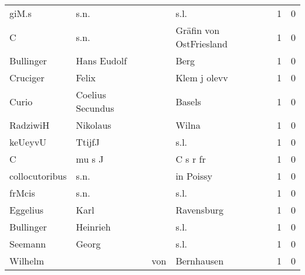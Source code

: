 \begin{tabular}{llllrr}
                    giM.s &                               s.n. &             &                                        s.l. &          1 &         0 \\
                        C &                               s.n. &             &                     Gräfin von OstFriesland &          1 &         0 \\
                Bullinger &                        Hans Eudolf &             &                                        Berg &          1 &         0 \\
                 Cruciger &                              Felix &             &                                Klem j olevv &          1 &         0 \\
                    Curio &                   Coelius Secundus &             &                                      Basels &          1 &         0 \\
                 RadziwiH &                           Nikolaus &             &                                       Wilna &          1 &         0 \\
                  keUeyvU &                             TtijfJ &             &                                        s.l. &          1 &         0 \\
                        C &                             mu s J &             &                                    C s r fr &          1 &         0 \\
           collocutoribus &                               s.n. &             &                                   in Poissy &          1 &         0 \\
                   frMcis &                               s.n. &             &                                        s.l. &          1 &         0 \\
                 Eggelius &                               Karl &             &                                  Ravensburg &          1 &         0 \\
                Bullinger &                           Heinrieh &             &                                        s.l. &          1 &         0 \\
                  Seemann &                              Georg &             &                                        s.l. &          1 &         0 \\
                  Wilhelm &                                    &         von &                                  Bernhausen &          1 &         0 \\

\end{tabular}

